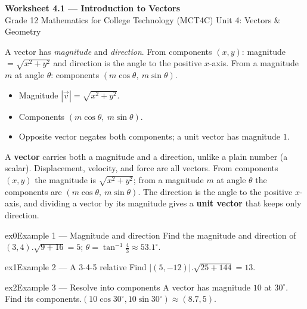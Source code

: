 \documentclass[11pt]{article}
\begin{document}
\begin{center}
{\LARGE\bfseries\color{titleblue}Worksheet 4.1 --- Introduction to Vectors}\\[2pt]
{\small Grade 12 Mathematics for College Technology (MCT4C) \textperiodcentered{} Unit 4: Vectors \& Geometry}
\end{center}

\begin{ideabox}
A vector has \emph{magnitude} and \emph{direction}. From components $(x,y)$: magnitude $=\sqrt{x^2+y^2}$ and direction is the angle to the positive $x$-axis. From a magnitude $m$ at angle $\theta$: components $(m\cos\theta,\ m\sin\theta)$.
\begin{itemize}[leftmargin=*,itemsep=2pt]
  \item Magnitude $|\vec v|=\sqrt{x^2+y^2}$.
  \item Components $(m\cos\theta,\ m\sin\theta)$.
  \item Opposite vector negates both components; a unit vector has magnitude $1$.
\end{itemize}
\end{ideabox}

\begin{learnbox}
A \textbf{vector} carries both a magnitude and a direction, unlike a plain number (a scalar). Displacement, velocity, and force are all vectors.
From components $(x,y)$ the magnitude is $\sqrt{x^2+y^2}$; from a magnitude $m$ at angle $\theta$ the components are $(m\cos\theta,\ m\sin\theta)$.
The direction is the angle to the positive $x$-axis, and dividing a vector by its magnitude gives a \textbf{unit vector} that keeps only direction.
\end{learnbox}


\begin{example}{ex0}{Example 1 --- Magnitude and direction}
Find the magnitude and direction of $(3,4)$.\soln $\sqrt{9+16}=5$; $\theta=\tan^{-1}\tfrac43\approx53.1^\circ$.
\end{example}

\begin{example}{ex1}{Example 2 --- A 3-4-5 relative}
Find $|(5,-12)|$.\soln $\sqrt{25+144}=13$.
\end{example}

\begin{example}{ex2}{Example 3 --- Resolve into components}
A vector has magnitude $10$ at $30^\circ$. Find its components.\soln $(10\cos30^\circ,10\sin30^\circ)\approx(8.7,5)$.
\end{example}
\end{document}
